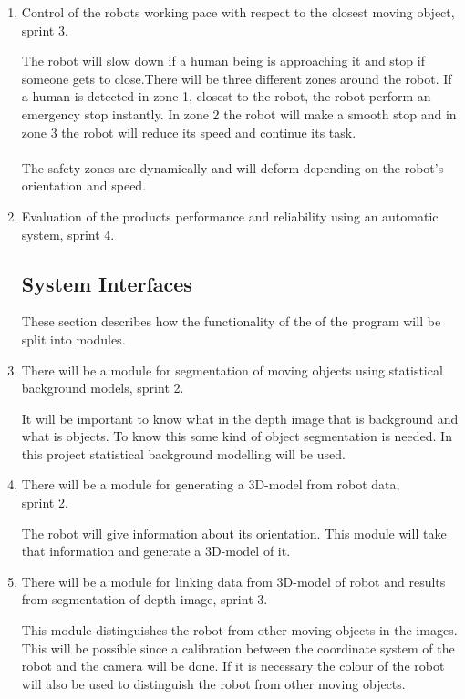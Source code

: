 \documentclass[10pt,a4paper]{article}
\begin{document}
\begin{enumerate}
\item Control of the robots working pace with respect to the closest moving object, sprint 3.

{\addtolength{\leftskip}{5mm}The robot will slow down if a human being is approaching it and stop if someone gets to close.There will be three different zones around the robot. If a human is detected in zone 1, closest to the robot, the robot perform an emergency stop instantly. In zone 2 the robot will make a smooth stop and in zone 3 the robot will reduce its speed and continue its task.
\\\\The safety zones are dynamically and will deform depending on the robot's orientation and speed. \par}

\item Evaluation of the products performance and reliability using an automatic system, sprint 4.

\subsection{System Interfaces}
These section describes how the functionality of the of the program will be split into modules.

\item There will be a module for segmentation of moving objects using statistical background models, sprint 2.

{\addtolength{\leftskip}{5mm}It will be important to know what in the depth image that is background and what is objects. To know this some kind of object segmentation is needed. In this project statistical background modelling will be used.\par}

\item There will be a module for generating a 3D-model from robot data,\\ sprint 2.
 
{\addtolength{\leftskip}{5mm}The robot will give information about its orientation. This module will take that information and generate a 3D-model of it.\par}
 
\item There will be a module for linking data from 3D-model of robot and results from segmentation of depth image, sprint 3.

{\addtolength{\leftskip}{5mm}This module distinguishes the robot from other moving objects in the images. This will be possible since a calibration between the coordinate system of the robot and the camera will be done. If it is necessary the colour of the robot will also be used to distinguish the robot from other moving objects.\par}



\end{enumerate}
\end{document}
